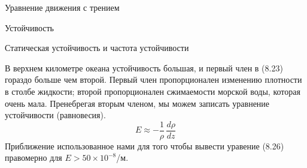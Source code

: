 \begin{chapter}{Уравнение движения с трением}
\begin{section}{Устойчивость}
\begin{paragraph}{Статическая устойчивость и частота устойчивости}

В верхнем километре океана устойчивость большая, и первый член в
(8.23) гораздо больше чем второй. Первый член пропорционален изменению
плотности в столбе жидкости; второй пропорционален сжимаемости морской
воды, которая очень мала. Пренебрегая вторым членом, мы можем записать
уравнение устойчивости (равновесия).
\begin{equation}
\boxed{E \approx -\frac{1}{\rho}\,\frac{d{\rho}}{d{z}} }
\end{equation}
Приближение использованное нами для того чтобы вывести уравение (8.26)
правомерно для $E> 50\times 10^{-8}$/м.
%



\end{paragraph}
\end{section}
\end{chapter}
